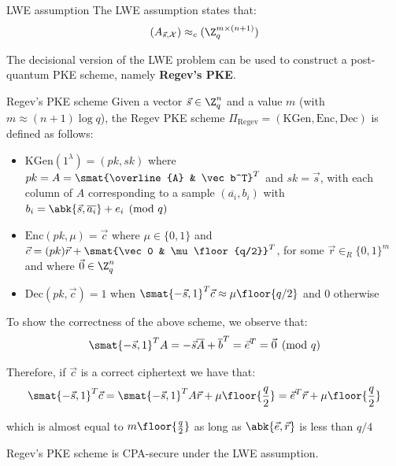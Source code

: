 \documentclass[a4paper, 12pt]{report}
\begin{document}
    \begin{framedass}{LWE assumption}
        The LWE assumption states that:
        \[(A_{\vec s, \mathcal{X}}) \approx_c (\Z_q^{m \times (n+1)})\]
    \end{framedass}

    The decisional version of the LWE problem can be used to construct a post-quantum PKE scheme, namely \textbf{Regev's PKE}.

    \begin{framedalgo}{Regev's PKE scheme}
        Given a vector $\vec s \in \Z_q^n$ and a value $m$ (with $m \approx (n+1) \log q$), the Regev PKE scheme $\Pi_{\text{Regev}} = (\mathrm{KGen}, \mathrm{Enc}, \mathrm{Dec})$ is defined as follows:
        \begin{itemize}
            \item $\mathrm{KGen}(1^\lambda) = (pk, sk)$ where $pk = A = \smat{\overline{A} & \vec b^T}^T$ and $sk = \vec s$, with each column of $A$ corresponding to a sample $(\overline{a_i}, b_i)$ with $b_i = \abk{\vec s, \overline{a_i}} + e_i \pmod q$
            \item $\mathrm{Enc}(pk, \mu) = \vec c$ where $\mu \in \{0,1\}$ and $\vec c = (pk) \vec r + \smat{\vec 0 & \mu \floor{q/2}}^T$, for some $\vec r \in_R \{0,1\}^m$ and where $\vec 0 \in \Z_q^n$
            \item $\mathrm{Dec}(pk, \vec c) = 1$ when $\smat{-\vec s, 1}^T \vec c \approx \mu \floor{q/2}$ and 0 otherwise
        \end{itemize}
    \end{framedalgo}

    To show the correctness of the above scheme, we observe that:
    \[\smat{- \vec s, 1}^T A = - \vec s \overline{A}+\overline{b}^T = \vec e^T= \vec 0 \pmod q\]

    Therefore, if $\vec c$ is a correct ciphertext we have that:
    \[\smat{- \vec s, 1}^T \vec c = \smat{- \vec s, 1}^T A \vec r + \mu \floor{\frac{q}{2}} = \vec e^T \vec r +  \mu \floor{\frac{q}{2}}\]

    which is almost equal to $m \floor{\frac{q}{2}}$ as long as $\abk{\vec e, \vec r}$ is less than $q/4$

    \begin{framedthm}{}
        Regev's PKE scheme is CPA-secure under the LWE assumption.
    \end{framedthm}
\end{document}
